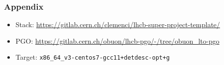 \documentclass{beamer}
\begin{document}
\appendix

\begin{frame}[fragile]
    \frametitle{Appendix}

    \begin{itemize}
        \item Stack: \scriptsize \url{https://gitlab.cern.ch/clemenci/lhcb-super-project-template/} \normalsize
        \item PGO: \scriptsize \url{https://gitlab.cern.ch/obuon/lhcb-pgo/-/tree/obuon_lto-pgo} \normalsize
        \item Target: \verb'x86_64_v3-centos7-gcc11+detdesc-opt+g'
    \end{itemize}
\end{frame}
\end{document}
